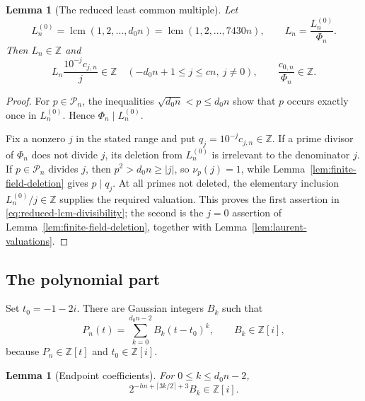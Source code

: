 \documentclass[11pt,reqno,letterpaper]{amsart}
\numberwithin{equation}{section}
\newtheorem{lemma}[theorem]{Lemma}
\theoremstyle{definition}
\theoremstyle{remark}
\DeclareMathOperator{\lcm}{lcm}
\begin{document}
\begin{lemma}[The reduced least common multiple]\label{lem:reduced-lcm}
Let
\begin{equation}\label{eq:two-lcms}
 L_n^{(0)}=\lcm(1,2,\ldots,d_0n)=\lcm(1,2,\ldots,7430n),
 \qquad L_n=\frac{L_n^{(0)}}{\Phi_n}.
\end{equation}
Then $L_n\in\mathbb Z$ and
\begin{equation}\label{eq:reduced-lcm-divisibility}
 L_n\frac{10^{-j}c_{j,n}}{j}\in\mathbb Z
 \quad(-d_0n+1\leq j\leq cn,\ j\ne0),
 \qquad \frac{c_{0,n}}{\Phi_n}\in\mathbb Z.
\end{equation}
\end{lemma}

\begin{proof}
For $p\in\mathcal P_n$, the inequalities
$\sqrt{d_0n}<p\leq d_0n$ show that $p$ occurs exactly once in
$L_n^{(0)}$.  Hence $\Phi_n\mid L_n^{(0)}$.

Fix a nonzero $j$ in the stated range and put
$q_j=10^{-j}c_{j,n}\in\mathbb Z$.  If a prime divisor of $\Phi_n$ does
not divide $j$, its deletion from $L_n^{(0)}$ is irrelevant to the
denominator $j$.  If $p\in\mathcal P_n$ divides $j$, then $p^2>d_0n
\geq|j|$, so $\nu_p(j)=1$, while Lemma~\ref{lem:finite-field-deletion}
gives $p\mid q_j$.  At all primes not deleted, the elementary inclusion
$L_n^{(0)}/j\in\mathbb Z$ supplies the required valuation.  This proves
the first assertion in \eqref{eq:reduced-lcm-divisibility}; the second is
the $j=0$ assertion of Lemma~\ref{lem:finite-field-deletion}, together
with Lemma~\ref{lem:laurent-valuations}.
\end{proof}

\subsection{The polynomial part}

Set $t_0=-1-2i$.  There are Gaussian integers $B_k$ such that
\begin{equation}\label{eq:endpoint-polynomial-expansion}
 P_n(t)=\sum_{k=0}^{d_0n-2}B_k(t-t_0)^k,
 \qquad B_k\in\mathbb Z[i],
\end{equation}
because $P_n\in\mathbb Z[t]$ and $t_0\in\mathbb Z[i]$.

\begin{lemma}[Endpoint coefficients]\label{lem:endpoint-coefficients}
For $0\leq k\leq d_0n-2$,
\begin{equation}\label{eq:endpoint-coefficient-bound}
 2^{-hn+\lceil3k/2\rceil+3}B_k\in\mathbb Z[i].
\end{equation}
\end{lemma}
\end{document}
